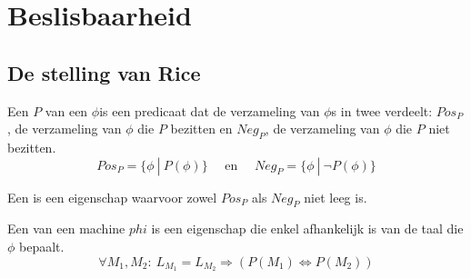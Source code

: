 \documentclass[main.tex]{subfiles}
\begin{document}
\chapter{Beslisbaarheid}
\label{cha:beslisbaarheid}

\section{De stelling van Rice}
\label{sec:de-stelling-van}

\begin{de}
  Een  $P$ van een $\phi$is een predicaat dat de verzameling van $\phi$s in twee verdeelt: $Pos_{P}$, de verzameling van $\phi$ die $P$ bezitten en $Neg_{P}$, de verzameling van $\phi$ die $P$ niet bezitten.
  \[ Pos_{P} = \{ \phi \ |\ P(\phi) \} \quad\text{ en }\quad Neg_{P} = \{ \phi \ |\ \neg P(\phi) \} \]
\end{de}

\begin{de}
  Een  is een eigenschap waarvoor zowel $Pos_{P}$ als $Neg_{P}$ niet leeg is.
\end{de}

\begin{de}
  Een  van een machine $phi$ is een eigenschap die enkel afhankelijk is van de taal die $\phi$ bepaalt.
  \[ \forall M_{1},M_{2}:\ L_{M_{1}} = L_{M_{2}} \Rightarrow (P(M_{1}) \Leftrightarrow P(M_{2})) \]
\end{de}
\end{document}
